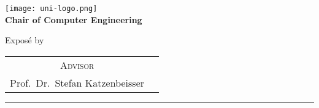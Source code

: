 \begin{titlepage}
    \centering
    \begin{onehalfspace}
    

        	\texttt{[image: uni-logo.png]}\\
        	\vspace{1.0cm}
        	\large {\bfseries Chair of Computer Engineering} \\


        	\vspace{2.5cm}


            \begin{doublespace}
            	{\textsf{\Huge{\thetitle}}}
            \end{doublespace}


        	\vspace{2cm}


            \Large{Exposé by}\\


        	\vspace{1cm}


        	{\bfseries \large{\theauthor}}


        	\vfill


        	{\large
        		\begin{tabular}[l]{cc}
        			\textsc{Advisor}\\
        			Prof.~Dr.~Stefan Katzenbeisser
        		\end{tabular}
        	}


        	\vspace{1.5cm}


        	\parbox{\linewidth}{\hrule\strut}


            \vfill


	    {\thedate}

    	
    \end{onehalfspace}
\end{titlepage}